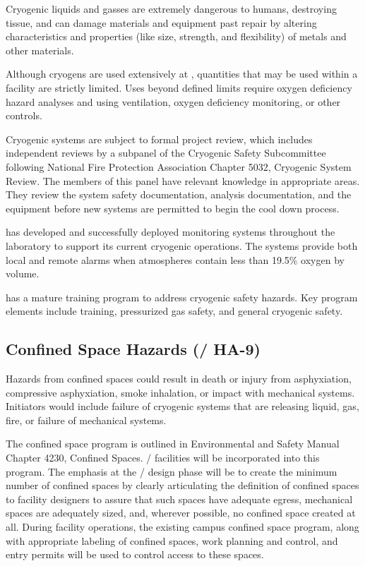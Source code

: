 Cryogenic liquids and gasses are extremely dangerous to humans,
destroying tissue, and can damage materials and equipment past repair
by altering characteristics and properties (like size, strength, and
flexibility) of metals and other materials.

Although cryogens are used extensively at \fnal, quantities that may
be used within a facility are strictly limited. Uses beyond defined
limits require oxygen deficiency hazard analyses and using
ventilation, oxygen deficiency monitoring, or other controls.

Cryogenic systems are subject to formal project review, which includes
independent reviews by a subpanel of the Cryogenic Safety Subcommittee
following National Fire Protection Association Chapter 5032, Cryogenic
System Review. The members of this panel have relevant knowledge in
appropriate areas. They review the system safety documentation,
 analysis documentation, and the equipment before new
systems are permitted to begin the cool down process.

\fnal has developed and successfully deployed  monitoring
systems throughout the laboratory to support its current cryogenic
operations. The systems provide both local and remote alarms when
atmospheres contain less than 19.5\% oxygen by volume.

\fnal has a mature training program to address cryogenic safety
hazards. Key program elements include  training,
pressurized gas safety, and general cryogenic safety.


\subsection{Confined Space Hazards (/ HA-9)}

Hazards from confined spaces could result in death or injury from
asphyxiation, compressive asphyxiation, smoke inhalation, or impact
with mechanical systems. Initiators would include failure of cryogenic
systems that are releasing liquid, gas, fire, or failure of mechanical
systems.

The \fnal confined space program is outlined in \fnal Environmental
and Safety Manual Chapter 4230, Confined
Spaces. / facilities will be incorporated into
this program. The emphasis at the / design
phase will be to create the minimum number of confined spaces by
clearly articulating the definition of confined spaces to facility
designers to assure that such spaces have adequate egress, mechanical
spaces are adequately sized, and, wherever possible, no confined space
created at all. During facility operations, the existing campus
confined space program, along with appropriate labeling of confined
spaces, work planning and control, and entry permits will be used to
control access to these spaces.


